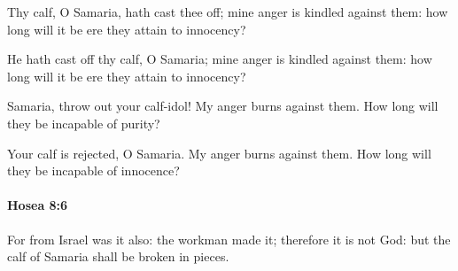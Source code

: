 			Thy calf, O Samaria, hath cast thee off; mine anger is kindled against them: how long will it be ere they attain to innocency?

			\begin{versebox}
					\item[BHS] 
					\item[LXX] 
					\item[ASV] He hath cast off thy calf, O Samaria; mine anger is kindled against them: how long will it be ere they attain to innocency?
					\item[NIV] Samaria, throw out your calf-idol! My anger burns against them. How long will they be incapable of purity?
					\item[NRSV] Your calf is rejected, O Samaria. My anger burns against them. How long will they be incapable of innocence?
			\end{versebox}

		\paragraph{Hosea 8:6} %
			\label{HOSEA-8-6}

			For from Israel was it also: the workman made it; therefore it is not God: but the calf of Samaria shall be broken in pieces.

